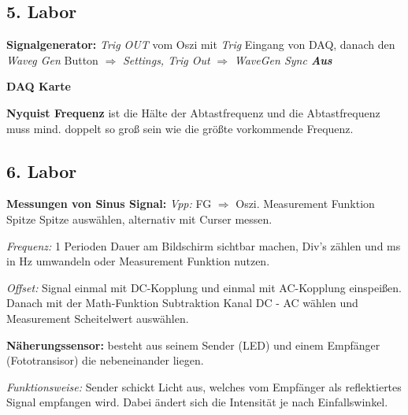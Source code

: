 \documentclass{article}
\begin{document}
\subsection*{5. Labor }
\textbf{Signalgenerator:} \textit{Trig OUT} vom Oszi mit \textit{Trig} Eingang von DAQ, danach den \textit{Waveg Gen} Button \(\Rightarrow\) \textit{Settings, Trig Out} \(\Rightarrow\) \textit{WaveGen Sync \textbf{Aus}} 

\textbf{DAQ Karte} 

\textbf{Nyquist Frequenz} ist die Hälte der Abtastfrequenz und die Abtastfrequenz muss mind. doppelt so groß sein wie die größte vorkommende Frequenz. 


\subsection*{6. Labor }

\textbf{Messungen von Sinus Signal:}
\textit{Vpp:} FG \( \Rightarrow \) Oszi. Measurement Funktion Spitze Spitze auswählen, alternativ mit Curser messen.

\textit{Frequenz:} 1 Perioden Dauer am Bildschirm sichtbar machen, Div's zählen und ms in Hz umwandeln oder Measurement Funktion nutzen. 

\textit{Offset:} Signal einmal mit DC-Kopplung  und einmal mit AC-Kopplung einspeißen. Danach mit der Math-Funktion Subtraktion Kanal DC - AC wählen  und Measurement Scheitelwert auswählen. 

\textbf{Näherungssensor:} besteht aus seinem Sender (LED) und einem Empfänger (Fototransisor) die nebeneinander liegen. 

\textit{Funktionsweise:} Sender schickt Licht aus, welches vom Empfänger als reflektiertes Signal empfangen wird. Dabei ändert sich die Intensität je nach Einfallswinkel. 
\end{document}
